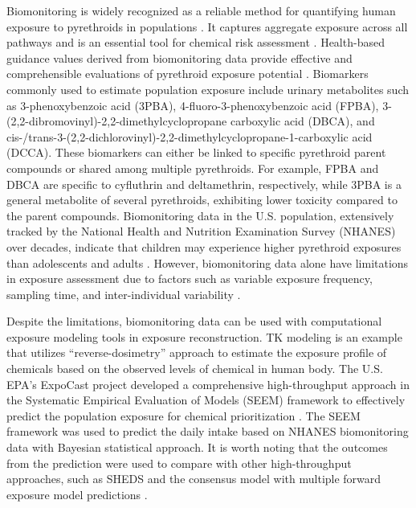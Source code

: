 \documentclass[toxics,article,submit,pdftex,moreauthors]{Definitions/mdpi}
\begin{document}
Biomonitoring is widely recognized as a reliable method for quantifying
human exposure to pyrethroids in populations
\citep{barr2010urinary, quindroit2021estimating, tarazona2022tiered}. It
captures aggregate exposure across all pathways and is an essential tool
for chemical risk assessment
\citep{blount2007perchlorate, sobus2015uses}. Health-based guidance
values derived from biomonitoring data provide effective and
comprehensible evaluations of pyrethroid exposure potential
\citep{apel2023human}. Biomarkers commonly used to estimate population
exposure include urinary metabolites such as 3-phenoxybenzoic acid
(3PBA), 4-fluoro-3-phenoxybenzoic acid (FPBA),
3-(2,2-dibromovinyl)-2,2-dimethylcyclopropane carboxylic acid (DBCA),
and
cis-/trans-3-(2,2-dichlorovinyl)-2,2-dimethylcyclopropane-1-carboxylic
acid (DCCA). These biomarkers can either be linked to specific
pyrethroid parent compounds or shared among multiple pyrethroids. For
example, FPBA and DBCA are specific to cyfluthrin and deltamethrin,
respectively, while 3PBA is a general metabolite of several pyrethroids,
exhibiting lower toxicity compared to the parent compounds.
Biomonitoring data in the U.S. population, extensively tracked by the
National Health and Nutrition Examination Survey (NHANES) over decades,
indicate that children may experience higher pyrethroid exposures than
adolescents and adults \citep{barr2010urinary}. However, biomonitoring
data alone have limitations in exposure assessment due to factors such
as variable exposure frequency, sampling time, and inter-individual
variability \citep{aylward2017variation}.

Despite the limitations, biomonitoring data can be used with
computational exposure modeling tools in exposure reconstruction. TK
modeling is an example that utilizes ``reverse-dosimetry'' approach to
estimate the exposure profile of chemicals
\citep{egeghy2011assessment, lin2023reconstructing} based on the
observed levels of chemical in human body. The U.S. EPA's ExpoCast
project developed a comprehensive high-throughput approach in the
Systematic Empirical Evaluation of Models (SEEM) framework to
effectively predict the population exposure for chemical prioritization
\citep{wambaugh2013high, stanfield2022bayesian}. The SEEM framework was
used to predict the daily intake based on NHANES biomonitoring data with
Bayesian statistical approach. It is worth noting that the outcomes from
the prediction were used to compare with other high-throughput
approaches, such as SHEDS \citep{isaacs2014sheds} and the consensus
model with multiple forward exposure model predictions
\citep{ring2018consensus}.
\end{document}
